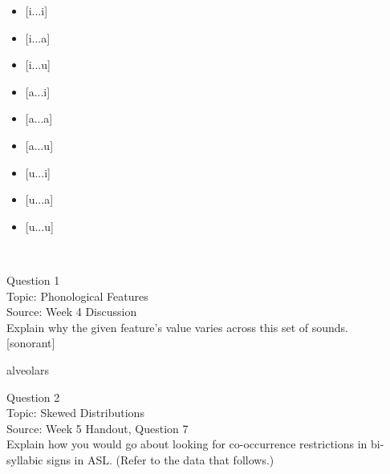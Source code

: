 \documentclass[12pt]{article}
\begin{document}
\begin{itemize} \item {[i...i]} \item {[i...a]} \item {[i...u]} \item {[a...i]} \item {[a...a]} \item {[a...u]} \item {[u...i]} \item {[u...a]} \item {[u...u]} \end{itemize}


\newpage

\begin{center}
\textbf{{\color{red}{\HUGE END OF EXAM}}}\\

\end{center}
\newpage

\begin{center}
\textbf{{\color{blue}{\HUGE START OF EXAM\\}}}

\textbf{{\color{blue}{\HUGE Student ID: 33428\\}}}

\textbf{{\color{blue}{\HUGE 9:20\\}}}

\end{center}
\newpage

{\large Question 1}\\

Topic: Phonological Features\\
Source: Week 4 Discussion\\

Explain why the given feature's value varies across this set of sounds.\\

{[sonorant]}

alveolars


\newpage

{\large Question 2}\\

Topic: Skewed Distributions\\
Source: Week 5 Handout, Question 7\\

Explain how you would go about looking for co-occurrence restrictions in bi-syllabic signs in ASL. (Refer to the data that follows.)\\
\end{document}
